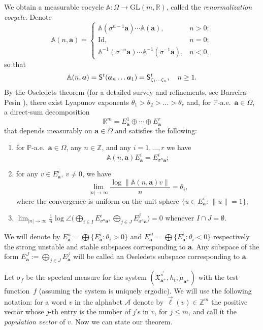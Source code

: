 \documentclass[10pt]{amsart}
\let\mathcal\mathscr
\newenvironment{enumeratei}
{\bgroup\def\theenumi{\roman{enumi}}\def\theenumii{\arabic{enumii}}\begin{enumerate}}
{\end{enumerate}\egroup}
\newcommand{\Id}{\mathrm{Id}}
\newcommand{\GL}{\mathrm{GL}}
\theoremstyle{plain}
\theoremstyle{definition}
\let\wt\widetilde
\newcommand\bom{{\boldsymbol a}}\let\ba\bom
\let\es\emptyset
\let\Om\Omega
\let\sig\sigma
\newcommand\Xx{\mathfrak{X}}
\newcommand\Ak{\mathcal{A}}
\newcommand\Aa{\mathbb{A}}
\newcommand{\R}{\mathbb{R}}
\newcommand{\Z}{\mathbb{Z}}
\renewcommand{\P}{\mathbb{P}}
\newcommand\Sf{{\sf S}}
\newcommand\be{\begin{equation}}
\newcommand\ee{\end{equation}}
\begin{document}
We obtain a measurable cocycle $\Aa: \Om\to \GL(m,\R)$, called the \emph{renormalization cocycle}. Denote\vspace*{-3pt}
\begin{equation}\label{renormcoc}
\Aa(n,\bom) = \begin{cases} \Aa(\sig^{n-1}\bom)\cdots \Aa(\bom), & n> 0; \\
\Id, & n=0; \\
\Aa^{-1}(\sig^{-n}\bom) \cdots \Aa^{-1}(\sig^{-1}\bom), & n<0,\end{cases}
\end{equation}
so that\vspace*{-3pt}
\[
\Aa(n,\bom) = \Sf^t(\bom_n\ldots \bom_1)= \Sf^t_{\zeta_1\ldots\zeta_n},\quad n\ge 1.\]
By the Oseledets theorem \cite{oseledets} (for a detailed survey and refinements, see Barreira-Pesin \cite[Th.\,3.5.5]{barpes}),
there exist Lyapunov exponents $\theta_1> \theta_2 > \ldots > \theta_r$ and, for $\P$-a.e.\ $\bom\in \Om$, a direct-sum decomposition\vspace*{-3pt}
\be \label{os1}
\R^m = E^1_\bom \oplus \cdots \oplus E^r_\bom
\ee
that depends measurably on $\bom\in \Om$ and satisfies the following:
\begin{enumeratei}
\item\label{sec:3i}
for $\P$-a.e.\ $\bom\in \Om$, any $n\in\Z$, and any $i=1,\ldots,r$ we have
\[
\Aa(n,\bom) E^i_\bom = E^i_{\sig^n\bom};
\]

\item\label{sec:3ii}
for any $v\in E^i_\bom,\ v\ne 0$, we have
\[
\lim_{|n|\to \infty} \frac{\log\|\Aa(n,\bom)v\|}{n} = \theta_i,
\]
where the convergence is uniform on the unit sphere $\{u\in E^i_\bom:\, \|u\|=1\}$;

\item\label{sec:3iii}
$\lim_{|n|\to \infty} \frac{1}{n}\log\angle\bigl(\bigoplus_{i\in I} E^i_{\sig^n\bom}, \bigoplus_{j\in J} E^j_{\sig^n \bom} \bigr) =0$ whenever $I\cap J = \es$.
\end{enumeratei}

We will denote by $E_\bom^{u}=\bigoplus\{E^i_\bom:\theta_i>0\}$ and $E_\bom^{st}=\bigoplus\{E^i_\bom:\theta_i<0\}$ respectively the strong unstable and stable subspaces corresponding to $\bom$. Any subspace of the form $E_\bom^J:=\bigoplus_{j\in J} E^j_\bom$ will be called an Oseledets subspace corresponding to $\bom$.

Let $\sig_f$ be the spectral measure for the system $(\Xx_{\bom^+}^{\vec{s}},h_t,\wt\mu_{\bom^+})$ with the test function~$f$ (assuming the system is uniquely ergodic).
We will use the following notation: for a word $v$ in the alphabet $\Ak$ denote by $\vec{\ell}(v)\in \Z^m$ the positive vector whose $j$-th entry is the number of $j$'s in $v$, for $j\le m$,
and call it the \emph{population vector} of $v$.
Now we can state our theorem.
\end{document}
